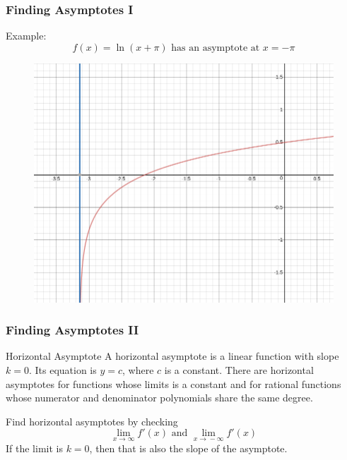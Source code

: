 \documentclass[xcolor=dvipsnames]{beamer}
\begin{document}
\begin{frame}
  \frametitle{Finding Asymptotes I}
Example:
\begin{equation}
  \label{eq:cheodieh}
f(x)=\ln(x+\pi)\mbox{ has an asymptote at }x=-\pi
\end{equation}
\begin{figure}[h]
\includegraphics[scale=.25]{./diagrams/asymp2.png}
\end{figure}
\end{frame}

\begin{frame}
  \frametitle{Finding Asymptotes II}
\begin{block}{Horizontal Asymptote}
  A horizontal asymptote is a linear function with slope $k=0$. Its
  equation is $y=c$, where $c$ is a constant. There are horizontal
  asymptotes for functions whose limits is a constant and for rational
  functions whose numerator and denominator polynomials share the same
  degree.
\end{block}
Find horizontal asymptotes by checking
\begin{equation}
  \label{eq:udaiguph}
  \lim_{x\rightarrow\infty}f'(x)\mbox{ and }\lim_{x\rightarrow{}-\infty}f'(x)
\end{equation}
If the limit is $k=0$, then that is also the slope of the asymptote.
\end{frame}
\end{document}
